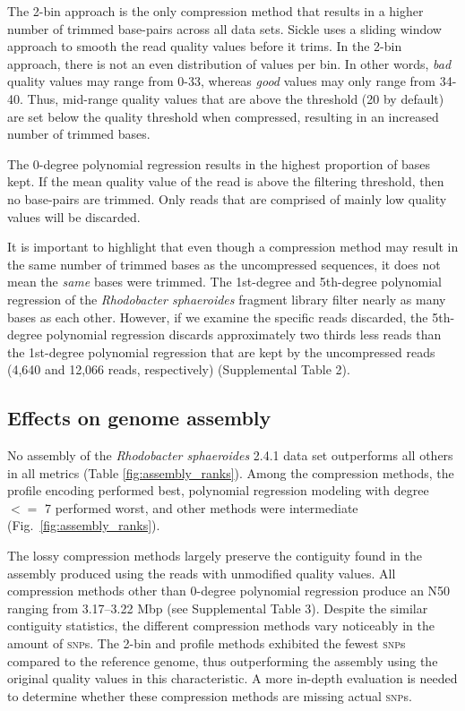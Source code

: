 \documentclass{bioinfo}
\begin{document}
The 2-bin approach is the only compression method that results in a
higher number of trimmed base-pairs across all data sets. Sickle uses
a sliding window approach to smooth the read quality values before it
trims. In the 2-bin approach, there is not an even distribution of
values per bin. In other words, \emph{bad} quality values may range
from 0-33, whereas \emph{good} values may only range from 34-40. Thus,
mid-range quality values that are above the threshold (20 by default)
are set below the quality threshold when compressed, resulting in an
increased number of trimmed bases.

The 0-degree polynomial regression results in the highest proportion
of bases kept. If the mean quality value of the read is above the
filtering threshold, then no base-pairs are trimmed. Only reads that
are comprised of mainly low quality values will be discarded.

It is important to highlight that even though a compression method may
result in the same number of trimmed bases as the uncompressed
sequences, it does not mean the \emph{same} bases were trimmed. The
1st-degree and 5th-degree polynomial regression of the
\textit{Rhodobacter sphaeroides} fragment library filter nearly as
many bases as each other. However, if we examine the specific reads
discarded, the 5th-degree polynomial regression discards approximately
two thirds less reads than the 1st-degree polynomial regression that
are kept by the uncompressed reads (4,640 and 12,066 reads,
respectively) (Supplemental Table 2).

\subsection{Effects on genome assembly}

No assembly of the \textit{Rhodobacter sphaeroides} 2.4.1 data set
outperforms all others in all metrics (Table
\ref{fig:assembly_ranks}).
Among the compression methods, the profile encoding performed best,
polynomial regression modeling with degree $<=$ 7 performed worst, and
other methods were intermediate (Fig.~\ref{fig:assembly_ranks}).

The lossy compression methods largely preserve the contiguity found in
the assembly produced using the reads with unmodified quality
values. All compression methods other than 0-degree polynomial
regression produce an N50 ranging from 3.17--3.22 Mbp (see
Supplemental Table 3). Despite the similar contiguity statistics, the
different compression methods vary noticeably in the amount of
\textsc{snp}s. The 2-bin and profile methods exhibited the fewest
\textsc{snp}s compared to the reference genome, thus outperforming the
assembly using the original quality values in this characteristic. A
more in-depth evaluation is needed to determine whether these
compression methods are missing actual \textsc{snp}s.
\end{document}
